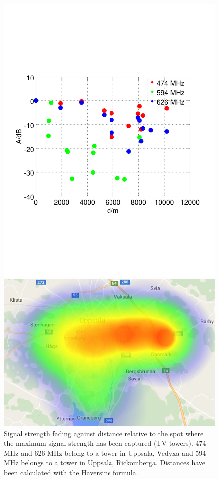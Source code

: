 \documentclass[conference]{IEEEtran}
\begin{document}
\begin{figure}[h]
	\centering
	\begin{minipage}{0.49\columnwidth}
	\includegraphics[width=\columnwidth]{./fig/haversine}
	\end{minipage}
	\hfill
	\begin{minipage}{0.49\columnwidth}
	\includegraphics[width=\columnwidth]{./fig/heatmap_626mhz}
	\end{minipage}
	\caption{Signal strength fading against distance relative to the spot where the maximum signal strength has been captured (TV towers). 474 MHz and 626 MHz belong to a tower in Uppsala, Vedyxa and 594 MHz belongs to a tower in Uppsala, Rickomberga. Distances have been calculated with the Haversine formula.}
\label{fig:haversine}
\end{figure}
\end{document}
